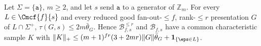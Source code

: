 

\begin{proposition}\label{prop:unary-cyclic-linear}
Let $\Sigma=\{\mathtt a\}$, $m\ge2$, and let $s$ send $\mathtt a$ to a generator of
$\mathbb Z_m$.  For every $L\in\Cmcf{f}{s}$ and every reduced good
fan-out-$\le f$, rank-$\le r$ presentation $G$ of $L\cap\Sigma^+$,
$\tau(G,s)\le2m\bar\theta_G$.  Hence $\mathcal B^{\le r}_{f,s}$ and
$\mathcal B_{f,s}$ have a common characteristic sample $K$ with
$\|K\|_+\le(m+1)^{fr}(3+2mr)\|G\|\bar\theta_G+\mathbf 1_{\{\eps\in L\}}$.
\end{proposition}

